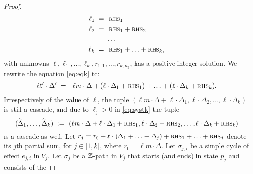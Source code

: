 \begin{appendixproof}
\begin{proof}
\begin{align}
\begin{aligned}
\ell_1 \ = \ & \ \textsc{rhs}_1 \\
\ell_2 \ = \ & \ \textsc{rhs}_1  +  \textsc{rhs}_2 \\
& \ldots \\
\ell_k \ = \ & \ \textsc{rhs}_1  +  \ldots  +  \textsc{rhs}_k,
\end{aligned}
\end{align}
with unknowns $\ell, \ell_1, \ldots, \ell_k, r_{1,1}, \ldots, r_{k,n_k}$, has a positive integer solution. We rewrite the equation \eqref{eq:eqk} to:
\begin{align} 
\begin{aligned}
\label{eq:syst}
\ell \ell'\cdot \Delta'  \ = \ \ \ell m \cdot \Delta +   (\ell\cdot \Delta_1 + \textsc{rhs}_1) + \ldots + (\ell \cdot \Delta_k + \textsc{rhs}_k).
\end{aligned}
\end{align}
%
Irrespectively of the value of $\ell$,
the tuple 
$(\ell m\cdot\Delta + \ell\cdot\Delta_1, \ell\cdot\Delta_2, \ldots, \ell\cdot\Delta_k)$ is still a cascade,
and due to $\ell_j>0$ in \eqref{eq:systk} the tuple
\[
(\widetilde\Delta_1, \ldots, \widetilde\Delta_k) \ := \ (\ell m\cdot\Delta + \ell\cdot\Delta_1 + \textsc{rhs}_1, \ell\cdot\Delta_2 + \textsc{rhs}_2, \ldots, \ell\cdot\Delta_k+\textsc{rhs}_k)
\]
is a cascade as well.
Let $r_j = r_0 + \ell\cdot(\Delta_1 + \ldots + \Delta_j) + \textsc{rhs}_1 + \ldots + \textsc{rhs}_j$
denote its $j$th partial sum, for $j\in[1, k]$, where $r_0 = \ell m \cdot \Delta$.
%
%
Let $\sigma_{j,i}$ be a simple cycle of effect $e_{j,i}$ in $V_j$.
Let $\sigma_j$
be a $\mathbb{Z}$-path in $V_j$ that starts (and ends) in state $p_j$ and consists of the  

\end{proof}
\end{appendixproof}
